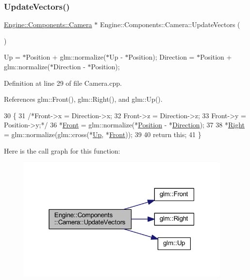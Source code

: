\subsubsection{\texorpdfstring{Update\+Vectors()}{UpdateVectors()}}
{\footnotesize\ttfamily \mbox{\hyperlink{classEngine_1_1Components_1_1Camera}{Engine\+::\+Components\+::\+Camera}} $\ast$ Engine\+::\+Components\+::\+Camera\+::\+Update\+Vectors (\begin{DoxyParamCaption}{ }\end{DoxyParamCaption})}

Up = $\ast$\+Position + glm\+::normalize($\ast$\+Up -\/ $\ast$\+Position); Direction = $\ast$\+Position + glm\+::normalize($\ast$\+Direction -\/ $\ast$\+Position); 

Definition at line 29 of file Camera.\+cpp.



References glm\+::\+Front(), glm\+::\+Right(), and glm\+::\+Up().


\begin{DoxyCode}
30 \{
31     \textcolor{comment}{/*Front->x = Direction->x;}
32 \textcolor{comment}{    Front->z = Direction->z;}
33 \textcolor{comment}{    Front->y = Position->y;*/}
36     *\mbox{\hyperlink{classEngine_1_1Components_1_1Camera_a9d8692aa379c9ab00f69df10d1d3651b}{Front}} = glm::normalize(*\mbox{\hyperlink{classEngine_1_1Components_1_1Camera_ab2c3ed9a1321a95db8fca95bc7f4b290}{Position}} - *\mbox{\hyperlink{classEngine_1_1Components_1_1Camera_a23619a66046258f1158313f0c790ffa2}{Direction}});
37 
38     *\mbox{\hyperlink{classEngine_1_1Components_1_1Camera_a10b30289c89694d13918a979bade13d9}{Right}} = glm::normalize(glm::cross(*\mbox{\hyperlink{classEngine_1_1Components_1_1Camera_a84a4199b9c60579a0f148b9980e05200}{Up}}, *\mbox{\hyperlink{classEngine_1_1Components_1_1Camera_a9d8692aa379c9ab00f69df10d1d3651b}{Front}}));
39 
40     \textcolor{keywordflow}{return} \textcolor{keyword}{this};
41 \}
\end{DoxyCode}
Here is the call graph for this function\+:
\nopagebreak
\begin{figure}[H]
\begin{center}
\leavevmode
\includegraphics[width=304pt]{classEngine_1_1Components_1_1Camera_aa80448fee84ef021ad89c29d10fbaafa_cgraph}
\end{center}
\end{figure}


